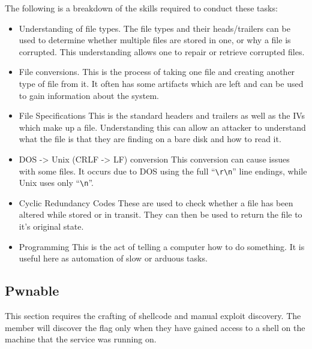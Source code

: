 \documentclass[a4paper,11pt]{report}
\begin{document}
			The following is a breakdown of the skills required to conduct these tasks:
			\begin{itemize}
				\item Understanding of file types. 
					The file types and their heads/trailers can be used to determine whether multiple files are stored in one, or why a file is corrupted. 
					This understanding allows one to repair or retrieve corrupted files.
				\item File conversions. 
					This is the process of taking one file and creating another type of file from it. 
					It often has some artifacts which are left and can be used to gain information about the system. 
				\item File Specifications
					This is the standard headers and trailers as well as the IVs which make up a file. 
					Understanding this can allow an attacker to understand what the file is that they are finding on a bare disk and how to read it. 
				\item DOS -> Unix (CRLF -> LF) conversion
					This conversion can cause issues with some files. 
					It occurs due to DOS using the full ``\verb+\r\n+'' line endings, while Unix uses only ``\verb+\n+''. 
				\item Cyclic Redundancy Codes
					These are used to check whether a file has been altered while stored or in transit. 
					They can then be used to return the file to it's original state. 
				\item Programming
					This is the act of telling a computer how to do something. 
					It is useful here as automation of slow or arduous tasks. 
			\end{itemize}

		\subsection{Pwnable}
			This section requires the crafting of shellcode and manual exploit discovery. 
			The member will discover the flag only when they have gained access to a shell on the machine that the service was running on. 
\end{document}
